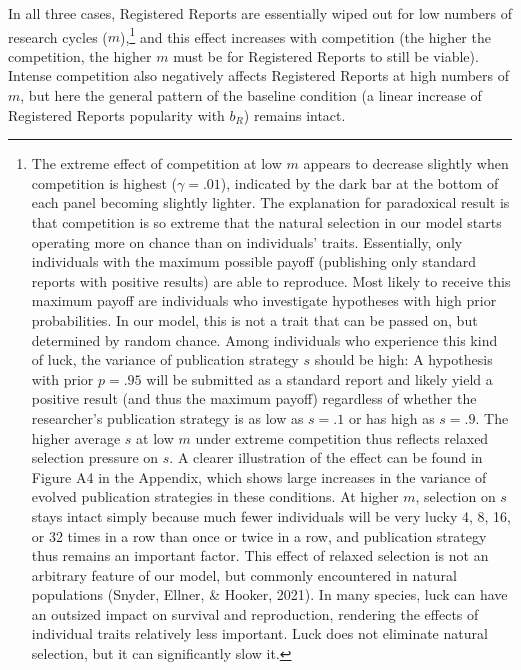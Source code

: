 \documentclass[
  ,man,mask,floatsintext]{apa6}
\begin{document}
In all three cases, Registered Reports are essentially wiped out for low numbers of research cycles (\(m\)),\footnote{The extreme effect of competition at low \(m\) appears to decrease slightly when competition is highest (\(\gamma = .01\)), indicated by the dark bar at the bottom of each panel becoming slightly lighter.
  The explanation for paradoxical result is that
  competition is so extreme that the natural selection in our model starts operating more on chance than on individuals' traits.
  Essentially, only individuals with the maximum possible payoff (publishing only standard reports with positive results) are able to reproduce.
  Most likely to receive this maximum payoff are individuals who investigate hypotheses with high prior probabilities.
  In our model, this is not a trait that can be passed on, but determined by random chance.
  Among individuals who experience this kind of luck, the variance of publication strategy \(s\) should be high:
  A hypothesis with prior \(p = .95\) will be submitted as a standard report and likely yield a positive result (and thus the maximum payoff) regardless of whether the researcher's publication strategy is as low as \(s = .1\) or has high as \(s = .9\).
  The higher average \(s\) at low \(m\) under extreme competition thus reflects relaxed selection pressure on \(s\).
  A clearer illustration of the effect can be found in Figure A4 in the Appendix, which shows large increases in the variance of evolved publication strategies in these conditions.
  At higher \(m\), selection on \(s\) stays intact simply because much fewer individuals will be very lucky 4, 8, 16, or 32 times in a row than once or twice in a row, and publication strategy thus remains an important factor.
  This effect of relaxed selection is not an arbitrary feature of our model, but commonly encountered in natural populations (Snyder, Ellner, \& Hooker, 2021).
  In many species, luck can have an outsized impact on survival and reproduction, rendering the effects of individual traits relatively less important.
  Luck does not eliminate natural selection, but it can significantly slow it.
} and this effect increases with competition (the higher the competition, the higher \(m\) must be for Registered Reports to still be viable).
Intense competition also negatively affects Registered Reports at high numbers of \(m\), but here the general pattern of the baseline condition (a linear increase of Registered Reports popularity with \(b_{R}\)) remains intact.
\end{document}
